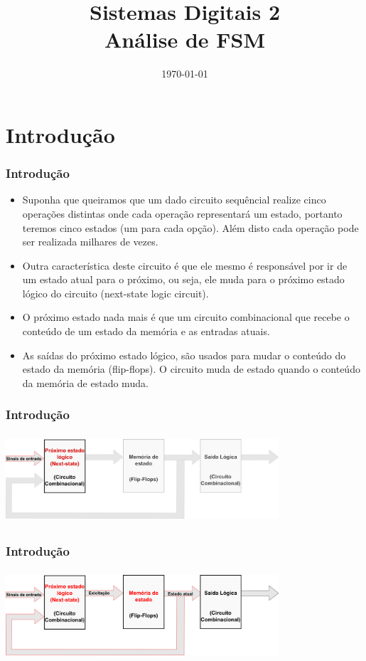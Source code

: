 \documentclass{beamer}
\title{Sistemas Digitais 2\\ \textbf{Análise de FSM}}
\date{\today}
\institute{\textbf{Universidade de Brasília - Faculdade do Gama}}
\begin{document}
\begin{frame}
  \titlepage
\end{frame}
  
\section{Introdução}

\begin{frame}
  \frametitle{Introdução}
  \begin{itemize}
    \item Suponha que queiramos que um dado circuito sequêncial realize 
      cinco operações distintas onde cada operação representará um estado, 
	    portanto teremos cinco estados (um para cada opção). Além disto
      cada operação pode ser realizada milhares de vezes.
      \pause
  \item Outra característica deste circuito é que ele mesmo é responsável por 
      ir de um estado atual para o próximo, ou seja, ele muda para o próximo 
      estado lógico do circuito (next-state logic circuit).
      \pause
  \item O próximo estado nada mais é que um circuito combinacional que recebe 
      o conteúdo de um estado da memória e as entradas atuais.
      \pause
  \item As saídas do próximo estado lógico, são usados para mudar o conteúdo 
      do estado da memória (flip-flops). O circuito muda de estado quando 
	    o conteúdo da memória de estado muda.
    \end{itemize}
  \end{frame}

\begin{frame}
  \frametitle{Introdução}
  \includegraphics[height=1.3in, width=4in]{images/modelo_1.png}
\end{frame}

\begin{frame}
  \frametitle{Introdução}
  \includegraphics[height = 1.3in, width = 4in]{images/modelo_2.png}
\end{frame}
\end{document}
